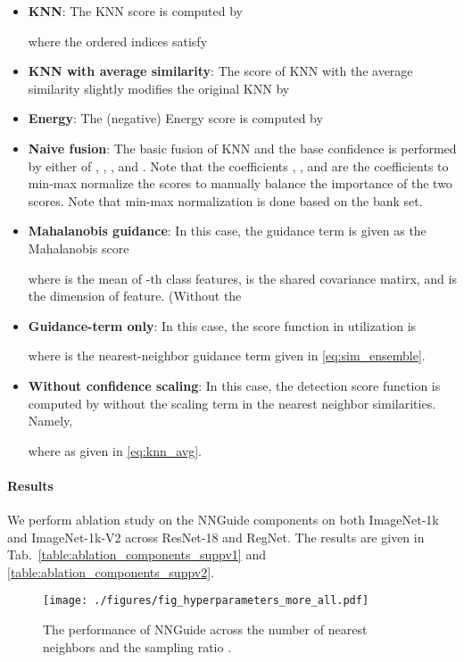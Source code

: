 \documentclass[10pt,twocolumn,letterpaper]{article}
\begin{document}
\begin{itemize}
\item 
\textbf{KNN}: The KNN score is computed by

where the ordered indices  satisfy

\item
\textbf{KNN with average similarity}: The score of KNN with the average similarity slightly modifies the original KNN by

\item
\textbf{Energy}: The (negative) Energy score is computed by

\item
\textbf{Naive fusion}: The basic fusion of KNN and the base confidence is performed by either of , , , and . Note that the coefficients , , and  are the coefficients to min-max normalize the scores to manually balance the importance of the two scores. Note that min-max normalization is done based on the bank set.
\item
\textbf{Mahalanobis guidance}: 
In this case, the guidance term  is given as the Mahalanobis score

where  is the mean of -th class features,  is the shared covariance matirx, and  is the dimension of feature. (Without the 
\item
\textbf{Guidance-term only}: In this case, the score function in utilization is 

where  is the nearest-neighbor guidance term given in \eqref{eq:sim_ensemble}.
\item
\textbf{Without confidence scaling}: In this case, the detection score function is computed by without the scaling term in the nearest neighbor similarities. Namely,

where  as given in \eqref{eq:knn_avg}.
\end{itemize}

\paragraph{Results}
We perform ablation study on the NNGuide components on both ImageNet-1k and ImageNet-1k-V2 across ResNet-18 and RegNet. The results are given in Tab.~\ref{table:ablation_components_suppv1} and \ref{table:ablation_components_suppv2}.


\begin{figure*}[t]
\centering
\texttt{[image: ./figures/fig\_hyperparameters\_more\_all.pdf]}
\caption{
The performance of NNGuide across the number  of nearest neighbors and the sampling ratio .
}
\label{fig:hyperparameters_supp}
\end{figure*}
\end{document}
